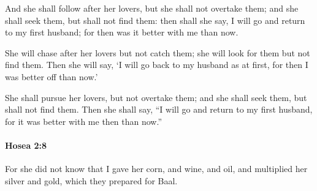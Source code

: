 			\begin{versebox}
					\item[BHS] 
					\item[LXX] 
					\item[ASV] And she shall follow after her lovers, but she shall not overtake them; and she shall seek them, but shall not find them: then shall she say, I will go and return to my first husband; for then was it better with me than now.
					\item[NIV] She will chase after her lovers but not catch them; she will look for them but not find them. Then she will say, ‘I will go back to my husband as at first, for then I was better off than now.’
					\item[NRSV] She shall pursue her lovers, but not overtake them; and she shall seek them, but shall not find them. Then she shall say, “I will go and return to my first husband, for it was better with me then than now.”
			\end{versebox}

		\paragraph{Hosea 2:8} %
			\label{HOSEA-2-8}

			For she did not know that I gave her corn, and wine, and oil, and multiplied her silver and gold, which they prepared for Baal.

